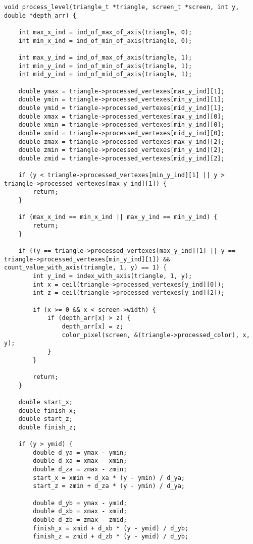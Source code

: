 \begin{lstlisting}[label=lst:lst1,caption=Алгоритм постолбцового Z-буффера]
void process_level(triangle_t *triangle, screen_t *screen, int y, double *depth_arr) {

    int max_x_ind = ind_of_max_of_axis(triangle, 0);
    int min_x_ind = ind_of_min_of_axis(triangle, 0);

    int max_y_ind = ind_of_max_of_axis(triangle, 1);
    int min_y_ind = ind_of_min_of_axis(triangle, 1);
    int mid_y_ind = ind_of_mid_of_axis(triangle, 1);

    double ymax = triangle->processed_vertexes[max_y_ind][1];
    double ymin = triangle->processed_vertexes[min_y_ind][1];
    double ymid = triangle->processed_vertexes[mid_y_ind][1];
    double xmax = triangle->processed_vertexes[max_y_ind][0];
    double xmin = triangle->processed_vertexes[min_y_ind][0];
    double xmid = triangle->processed_vertexes[mid_y_ind][0];
    double zmax = triangle->processed_vertexes[max_y_ind][2];
    double zmin = triangle->processed_vertexes[min_y_ind][2];
    double zmid = triangle->processed_vertexes[mid_y_ind][2];

    if (y < triangle->processed_vertexes[min_y_ind][1] || y > triangle->processed_vertexes[max_y_ind][1]) {
        return;
    }

    if (max_x_ind == min_x_ind || max_y_ind == min_y_ind) {
        return;
    }

    if ((y == triangle->processed_vertexes[max_y_ind][1] || y == triangle->processed_vertexes[min_y_ind][1]) && count_value_with_axis(triangle, 1, y) == 1) {
        int y_ind = index_with_axis(triangle, 1, y);
        int x = ceil(triangle->processed_vertexes[y_ind][0]);
        int z = ceil(triangle->processed_vertexes[y_ind][2]);

        if (x >= 0 && x < screen->width) {
            if (depth_arr[x] > z) {
                depth_arr[x] = z;
                color_pixel(screen, &(triangle->processed_color), x, y);
            }
        }

        return;
    }

    double start_x;
    double finish_x;
    double start_z;
    double finish_z;

    if (y > ymid) {
        double d_ya = ymax - ymin;
        double d_xa = xmax - xmin;
        double d_za = zmax - zmin;
        start_x = xmin + d_xa * (y - ymin) / d_ya;
        start_z = zmin + d_za * (y - ymin) / d_ya;

        double d_yb = ymax - ymid;
        double d_xb = xmax - xmid;
        double d_zb = zmax - zmid;
        finish_x = xmid + d_xb * (y - ymid) / d_yb;
        finish_z = zmid + d_zb * (y - ymid) / d_yb;
        

\end{lstlisting}
